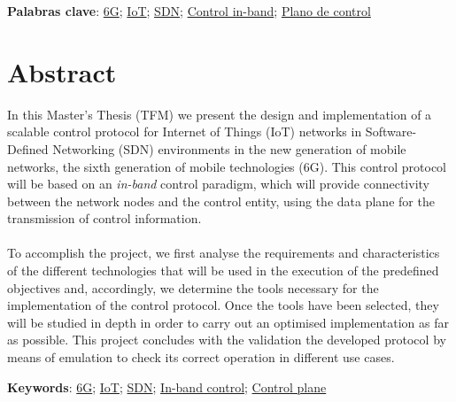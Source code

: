 \vspace{1cm}

\textbf{Palabras clave}: \href{https://scholar.google.com/scholar?q=6g}{6G}; \href{https://scholar.google.es/scholar?q=Internet+of+Things}{IoT};
\href{https://www.opennetworking.org/sdn-definition}{SDN}; \href{https://scholar.google.com/scholar?q=sdn+in-band+control}{Control in-band};
\href{https://scholar.google.es/scholar?q=control+plane+sdn}{Plano de control}


\cleardoublepage %



\chapter{Abstract}
\thispagestyle{empty}

In this Master's Thesis (TFM) we present the design and implementation of a scalable control protocol for Internet of Things (IoT) networks in Software-Defined Networking (SDN) environments in the new generation of mobile networks, the sixth generation of mobile technologies (6G). This control protocol will be based on an \textit{in-band} control paradigm, which will provide connectivity between the network nodes and the control entity, using the data plane for the transmission of control information.\\
\\
To accomplish the project, we first analyse the requirements and characteristics of the different technologies that will be used in the execution of the predefined objectives and, accordingly, we determine the tools necessary for the implementation of the control protocol. Once the tools have been selected, they will be studied in depth in order to carry out an optimised implementation as far as possible. This project concludes with the validation the developed protocol by means of emulation to check its correct operation in different use cases.


\vspace{1cm}

\textbf{Keywords}: \href{https://scholar.google.com/scholar?q=6g}{6G}; \href{https://scholar.google.es/scholar?q=Internet+of+Things}{IoT};
\href{https://www.opennetworking.org/sdn-definition}{SDN}; \href{https://scholar.google.com/scholar?q=sdn+in-band+control}{In-band control};
\href{https://scholar.google.es/scholar?q=control+plane+sdn}{Control plane}



